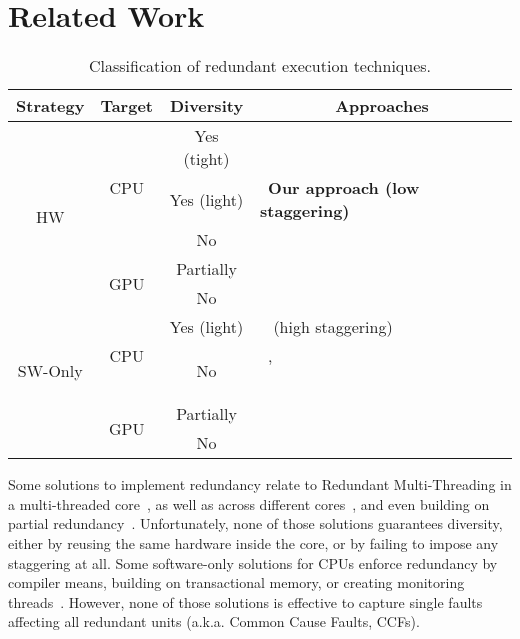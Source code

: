 \section{Related Work}
\label{sec:rel}

\begin{table}[t!]
\centering
\caption{Classification of redundant execution techniques.}
\label{table:Fault-Tolerant-Classification}
\begin{tabular}{|c|c|c|l|}
\hline
Strategy & Target & Diversity & \multicolumn{1}{c|}{Approaches} \\ \hline
\multirow{5}{*}{HW} & \multirow{3}{*}{CPU} & Yes (tight) & ~\cite{STlockstep,Iturbe2019,relaxing_criticallity} \\ \cline{3-4}
 &  & Yes (light) & ~\textbf{Our approach (low staggering)} \\ \cline{3-4}
 &  & No & ~\cite{Rotenberg1999,SMTredundancy,Mukherjee2002,Gomaa2003,dynamic_coupled_cores,on_demand_redundancy} \\ \cline{2-4}
 & \multirow{2}{*}{GPU} & Partially & ~\cite{SergiDATE} \\ \cline{3-4}
 &  & No & ~\cite{instruction_replication_gpu,Jeon2012,Swapcodes,Nathan2015} \\ \hline
\multirow{4}{*}{SW-Only} & \multirow{3}{*}{CPU} & Yes (light) & ~\cite{SergiDFT} (high staggering)\\ \cline{3-4}
 &  & \multirow{2}{*}{No} & ~\cite{Haas2017,Shye2007,Scales2010,Reis2005}, \\ %
 &  &    & ~\cite{So2018,Alhakeem2015,Shye2009,Mushtaq2013} \\ \cline{2-4}
 & \multirow{2}{*}{GPU} & Partially & ~\cite{SergiIOLTS} \\ \cline{3-4}
 &  & No & ~\cite{softwareapproaches_gpgpureliability,inter-intra-workgroup,Jain2019,Vargas2018} \\ \hline
\end{tabular}
\end{table}



Some solutions to implement redundancy relate to Redundant Multi-Threading in a multi-threaded core~\cite{SMTredundancy,Rotenberg1999}, as well as across different cores~\cite{Mukherjee2002,Gomaa2003,dynamic_coupled_cores}, and even building on partial redundancy~\cite{relaxing_criticallity,on_demand_redundancy}. Unfortunately, none of those solutions guarantees diversity, either by reusing the same hardware inside the core, or by failing to impose any staggering at all. 
Some software-only solutions for CPUs enforce redundancy by compiler means, building on transactional memory, or creating monitoring threads~\cite{Reis2005,So2018,Haas2017,Mushtaq2013,Shye2007,Shye2009}.
However, none of those solutions is effective to capture single faults affecting all redundant units (a.k.a. Common Cause Faults, CCFs).

